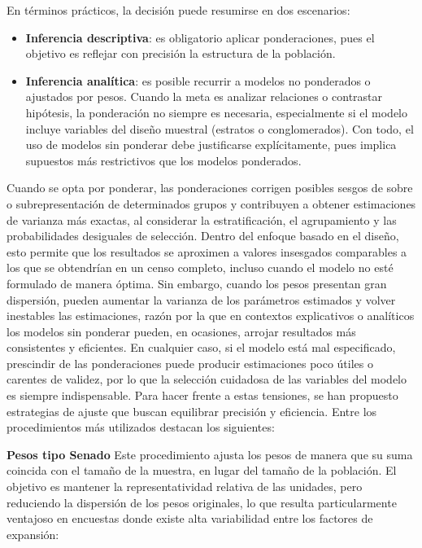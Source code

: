 \documentclass[
  spanish,
  12pt,
]{book}
\begin{document}
En términos prácticos, la decisión puede resumirse en dos escenarios:

\begin{itemize}
\item
  \textbf{Inferencia descriptiva}: es obligatorio aplicar ponderaciones, pues el objetivo es reflejar con precisión la estructura de la población.
\item
  \textbf{Inferencia analítica}: es posible recurrir a modelos no ponderados o ajustados por pesos. Cuando la meta es analizar relaciones o contrastar hipótesis, la ponderación no siempre es necesaria, especialmente si el modelo incluye variables del diseño muestral (estratos o conglomerados). Con todo, el uso de modelos sin ponderar debe justificarse explícitamente, pues implica supuestos más restrictivos que los modelos ponderados.
\end{itemize}

Cuando se opta por ponderar, las ponderaciones corrigen posibles sesgos de sobre o subrepresentación de determinados grupos y contribuyen a obtener estimaciones de varianza más exactas, al considerar la estratificación, el agrupamiento y las probabilidades desiguales de selección. Dentro del enfoque basado en el diseño, esto permite que los resultados se aproximen a valores insesgados comparables a los que se obtendrían en un censo completo, incluso cuando el modelo no esté formulado de manera óptima. Sin embargo, cuando los pesos presentan gran dispersión, pueden aumentar la varianza de los parámetros estimados y volver inestables las estimaciones, razón por la que en contextos explicativos o analíticos los modelos sin ponderar pueden, en ocasiones, arrojar resultados más consistentes y eficientes. En cualquier caso, si el modelo está mal especificado, prescindir de las ponderaciones puede producir estimaciones poco útiles o carentes de validez, por lo que la selección cuidadosa de las variables del modelo es siempre indispensable.
Para hacer frente a estas tensiones, se han propuesto estrategias de ajuste que buscan equilibrar precisión y eficiencia. Entre los procedimientos más utilizados destacan los siguientes:

\textbf{Pesos tipo Senado}
Este procedimiento ajusta los pesos de manera que su suma coincida con el tamaño de la muestra, en lugar del tamaño de la población. El objetivo es mantener la representatividad relativa de las unidades, pero reduciendo la dispersión de los pesos originales, lo que resulta particularmente ventajoso en encuestas donde existe alta variabilidad entre los factores de expansión:
\end{document}
